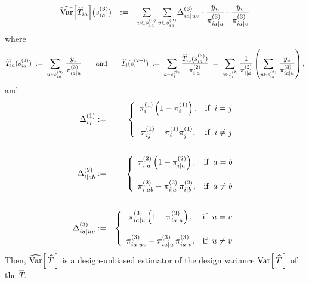 \begin{theorem}
\begin{equation*}
\begin{array}{cclcl}
\widehat{\textnormal{Var}}\!\left[\widehat{T}_{ia}\right]\!(s^{(3)}_{ia})
&:=&
\underset{u \in s^{(3)}_{ia}}{\sum}\,\underset{v \in s^{(3)}_{ia}}{\sum}\Delta^{(3)}_{ia\vert uv}\cdot\dfrac{y_{u}}{\pi^{(3)}_{ia\vert u}}\cdot\dfrac{y_{v}}{\pi^{(3)}_{ia\vert v}}
\end{array}
\end{equation*}
where
\begin{equation*}
\widehat{T}_{ia}(s^{(3)}_{ia})\;:=\;\sum_{u \in s^{(3)}_{ia}}\,\dfrac{y_{u}}{\pi^{(3)}_{ia\vert u}}
\quad\quad\textnormal{and}\quad\quad
\widehat{T}_{i}(s^{(2+)}_{i})
\;:=\;\sum_{a\in s^{(2)}_{i}}\dfrac{\widehat{T}_{ia}(s^{(3)}_{ia})}{\pi^{(2)}_{i\vert a}}
\;=\;\sum_{a\in s^{(2)}_{i}}\dfrac{1}{\pi^{(2)}_{i\vert a}}\left(\sum_{u \in s^{(3)}_{ia}}\,\dfrac{y_{u}}{\pi^{(3)}_{ia\vert u}}\right),
\end{equation*}
and
\begin{eqnarray*}
\Delta^{(1)}_{ij}
&:=&
\left\{
\begin{array}{cl}
\pi^{(1)}_{i}\left(1 - \pi^{(1)}_{i}\right), & \textnormal{if}\;\; i = j
\\ \\
\pi^{(1)}_{ij} - \pi^{(1)}_{i}\pi^{(1)}_{j}, & \textnormal{if}\;\; i \neq j
\end{array}
\right.
\\ \\
\Delta^{(2)}_{i \vert ab}
&:=&
\left\{
\begin{array}{cl}
\pi^{(2)}_{i \vert a}\left(1 - \pi^{(2)}_{i\vert a}\right), & \textnormal{if}\;\; a = b
\\ \\
\pi^{(2)}_{i \vert ab} - \pi^{(2)}_{i \vert a}\,\pi^{(2)}_{i \vert b}, & \textnormal{if}\;\; a \neq b
\end{array}
\right.
\\ \\
\Delta^{(3)}_{ia \vert uv}
&:=&
\left\{
\begin{array}{cl}
\pi^{(3)}_{ia \vert u}\left(1 - \pi^{(3)}_{ia \vert u}\right), & \textnormal{if}\;\; u = v
\\ \\
\pi^{(3)}_{ia \vert uv} - \pi^{(3)}_{ia \vert u}\,\pi^{(3)}_{ia \vert v}, & \textnormal{if}\;\; u \neq v
\end{array}
\right.
\end{eqnarray*}
Then, $\widehat{\textnormal{Var}}\!\left[\,\widehat{T}\,\right]$ is a design-unbiased estimator of the design variance
$\textnormal{Var}\!\left[\,\widehat{T}\,\right]$ of the $\widehat{T}$.
\end{theorem}

